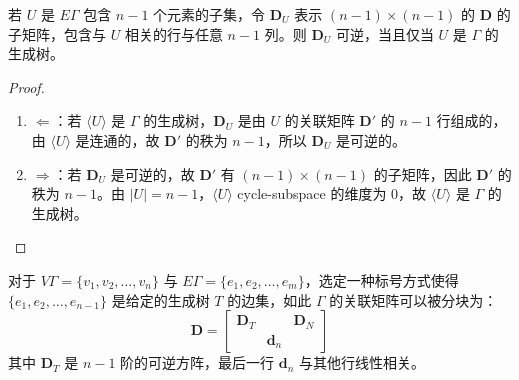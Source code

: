 \begin{proposition}
若 $U$ 是 $E\Gamma$ 包含 $n - 1$ 个元素的子集，令 $\textbf{D}_U$ 表示 $(n - 1)\times(n - 1)$ 的 $\textbf{D}$ 的子矩阵，包含与 $U$ 相关的行与任意 $n - 1$ 列。则 $\textbf{D}_U$ 可逆，当且仅当 $U$ 是 $\Gamma$ 的生成树。
\end{proposition}
\begin{proof}
\begin{enumerate}
    \item $\Leftarrow$：若 $\langle U \rangle$ 是 $\Gamma$ 的生成树，$\textbf{D}_U$ 是由 $U$ 的关联矩阵 $\textbf{D}'$ 的 $n - 1$ 行组成的，由 $\langle U\rangle$ 是连通的，故 $\textbf{D}'$ 的秩为 $n-1$，所以 $\textbf{D}_U$ 是可逆的。
    \item $\Rightarrow$：若 $\textbf{D}_U$ 是可逆的，故 $\textbf{D}'$ 有 $(n - 1)\times(n - 1)$ 的子矩阵，因此 $\textbf{D}'$ 的秩为 $n - 1$。由 $|U| = n - 1$，$\langle U\rangle$ cycle-subspace 的维度为 $0$，故 $\langle U\rangle$ 是 $\Gamma$ 的生成树。
\end{enumerate}
\end{proof}

对于 $V\Gamma = \{v_1, v_2, \dots, v_n\}$ 与 $E\Gamma = \{e_1, e_2, \dots, e_m\}$，选定一种标号方式使得 $\{e_1, e_2, \dots, e_{n-1}\}$ 是给定的生成树 $T$ 的边集，如此 $\Gamma$ 的关联矩阵可以被分块为：
\[
\mathbf{D} = \left[
\begin{array}{ccc}
\mathbf{D}_{T} & & \mathbf{D}_{N} \\
& \mathbf{d}_{n} &
\end{array}
\right]
\]
其中 $\textbf{D}_T$ 是 $n - 1$ 阶的可逆方阵，最后一行 $\textbf{d}_n$ 与其他行线性相关。

